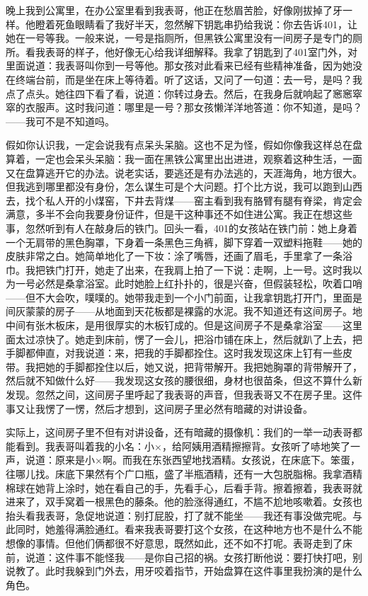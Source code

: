 晚上我到公寓里，在办公室里看到我表哥，他正在愁眉苦脸，好像刚拔掉了牙一样。他瞪着死鱼眼睛看了我好半天，忽然解下钥匙串扔给我说：你去告诉401，让她在一号等我。一般来说，一号是指厕所，但黑铁公寓里没有一间房子是专门的厕所。看我表哥的样子，他好像无心给我详细解释。我拿了钥匙到了401室门外，对里面说道：我表哥叫你到一号等他。那女孩对此看来已经有些精神准备，因为她没在终端台前，而是坐在床上等待着。听了这话，又问了一句道：去一号，是吗？我点了点头。她往四下看了看，说道：你转过身去。然后，在我身后就响起了窸窸窣窣的衣服声。这时我问道：哪里是一号？那女孩懒洋洋地答道：你不知道，是吗？——我可不是不知道吗。 

假如你认识我，一定会说我有点呆头呆脑。这也不足为怪，假如你像我这样总在盘算着，一定也会呆头呆脑：我一面在黑铁公寓里出出进进，观察着这种生活，一面又在盘算逃开它的办法。说老实话，要逃还是有办法逃的，天涯海角，地方很大。但我逃到哪里都没有身份，怎么谋生可是个大问题。打个比方说，我可以跑到山西去，找个私人开的小煤窑，下井去背煤——窑主看到我有胳臂有腿有脊梁，肯定会满意，多半不会向我要身份证件，但是干这种事还不如住进公寓。我正在想这些事，忽然听到有人在敲身后的铁门。回头一看，401的女孩站在铁门前：她上身着一个无肩带的黑色胸罩，下身着一条黑色三角裤，脚下穿着一双塑料拖鞋——她的皮肤非常之白。她简单地化了一下妆：涂了嘴唇，还画了眉毛，手里拿了一条浴巾。我把铁门打开，她走了出来，在我肩上拍了一下说：走啊，上一号。这时我以为一号必然是桑拿浴室。此时她脸上红扑扑的，很是兴奋，但假装轻松，吹着口哨——但不大会吹，噗噗的。她带我走到一个小门前面，让我拿钥匙打开门，里面是间灰蒙蒙的房子——从地面到天花板都是裸露的水泥。我不知道还有这间房子。地中间有张木板床，是用很厚实的木板钉成的。但是这间房子不是桑拿浴室——这里面太过凉快了。她走到床前，愣了一会儿，把浴巾铺在床上，然后就趴了上去，把手脚都伸直，对我说道：来，把我的手脚都拴住。这时我发现这床上钉有一些皮带。我把她的手脚都拴住以后，她又说，把背带解开。我把她胸罩的背带解开了，然后就不知做什么好——我发现这女孩的腰很细，身材也很苗条，但这不算什么新发现。忽然之间，这间房子里呼起了我表哥的声音，但我表哥又不在房子里。这件事又让我愣了一愣，然后才想到，这间房子里必然有暗藏的对讲设备。 

实际上，这间房子里不但有对讲设备，还有暗藏的摄像机：我们的一举一动表哥都能看到。我表哥叫着我的小名：小×，给阿姨用酒精擦擦背。女孩听了哧地笑了一声，说道：原来是小×啊。而我在东张西望地找酒精。女孩说，在床底下。笨蛋，往哪儿找。床底下果然有个广口瓶，盛了半瓶酒精，还有一大包脱脂棉。我拿酒精棉球在她背上涂时，她在看自己的手，先看手心，后看手背。擦着擦着，我表哥就进来了，双手窝着一根黑色的藤条。他的脸涨得通红，不尴不尬地咳嗽着。女孩也抬头看我表哥，急促地说道：别打屁股，打了就不能坐——我还有事没做完呢。与此同时，她羞得满脸通红。看来我表哥要打这个女孩，在这种地方也不是什么不能想像的事情。但他们俩都很不好意思，既然如此，还不如不打呢。表哥走到了床前，说道：这件事不能怪我——是你自己招的祸。女孩打断他说：要打快打吧，别说教了。此时我躲到门外去，用牙咬着指节，开始盘算在这件事里我扮演的是什么角色。 

